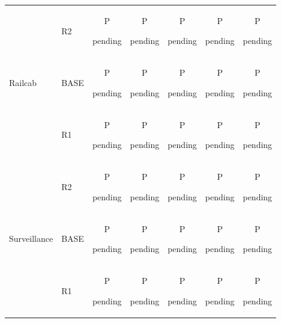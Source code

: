 \begin{tabular}{@{}llccccc@{}}
 & R2 & \shortstack[c]{\strut P\\[-3pt]\strut pending} & \shortstack[c]{\strut P\\[-3pt]\strut pending} & \shortstack[c]{\strut P\\[-3pt]\strut pending} & \shortstack[c]{\strut P\\[-3pt]\strut pending} & \shortstack[c]{\strut P\\[-3pt]\strut pending}\\
\addlinespace[2pt]
Railcab & BASE & \shortstack[c]{\strut P\\[-3pt]\strut pending} & \shortstack[c]{\strut P\\[-3pt]\strut pending} & \shortstack[c]{\strut P\\[-3pt]\strut pending} & \shortstack[c]{\strut P\\[-3pt]\strut pending} & \shortstack[c]{\strut P\\[-3pt]\strut pending}\\
 & R1 & \shortstack[c]{\strut P\\[-3pt]\strut pending} & \shortstack[c]{\strut P\\[-3pt]\strut pending} & \shortstack[c]{\strut P\\[-3pt]\strut pending} & \shortstack[c]{\strut P\\[-3pt]\strut pending} & \shortstack[c]{\strut P\\[-3pt]\strut pending}\\
 & R2 & \shortstack[c]{\strut P\\[-3pt]\strut pending} & \shortstack[c]{\strut P\\[-3pt]\strut pending} & \shortstack[c]{\strut P\\[-3pt]\strut pending} & \shortstack[c]{\strut P\\[-3pt]\strut pending} & \shortstack[c]{\strut P\\[-3pt]\strut pending}\\
\addlinespace[2pt]
Surveillance & BASE & \shortstack[c]{\strut P\\[-3pt]\strut pending} & \shortstack[c]{\strut P\\[-3pt]\strut pending} & \shortstack[c]{\strut P\\[-3pt]\strut pending} & \shortstack[c]{\strut P\\[-3pt]\strut pending} & \shortstack[c]{\strut P\\[-3pt]\strut pending}\\
 & R1 & \shortstack[c]{\strut P\\[-3pt]\strut pending} & \shortstack[c]{\strut P\\[-3pt]\strut pending} & \shortstack[c]{\strut P\\[-3pt]\strut pending} & \shortstack[c]{\strut P\\[-3pt]\strut pending} & \shortstack[c]{\strut P\\[-3pt]\strut pending}\\

\end{tabular}
